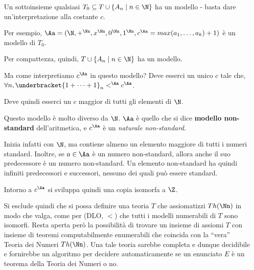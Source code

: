 \documentclass[a4paper,11pt]{report}
\begin{document}
Un sottoinsieme qualsiasi \( T_0 \subseteq T \cup \{A_n \mid n\in \N\} \) ha un modello - basta dare un'interpretazione alla costante \( c \).

Per esempio, \( \Aa = (\N, +^\Nn, x^\Nn, 0^\Nn, 1^\Nn, c^\Aa = max(a_1, \dots, a_k)+1)\) è un modello di \( T_0 \).

Per compattezza, quindi, \(T\cup \{A_n \mid n \in \N\}  \) ha un modello.

Ma come interpretiamo \( c^\Aa \) in questo modello? Deve esserci un unico \( c \) tale che, \( \forall n, \underbracket{1 + \dots + 1}_{n} <^\Aa c^\Aa  \).

Deve quindi esserci un \( c \) maggior di tutti gli elementi di \( \N \). 

Questo modello è molto diverso da \( \N \). \( \Aa \) è quello che si dice \textbf{modello non-standard} dell'aritmetica, e \( c^\Aa \) è un \textit{naturale non-standard}.

Inizia infatti con \( \N \), ma contiene almeno un elemento maggiore di tutti i numeri standard. Inoltre, se \( a\in \Aa \)  è un numero non-standard, allora anche il suo predecessore è un numero non-standard. Un elemento non-standard ha quindi infiniti predecessori e successori, nessuno dei quali può essere standard. 

Intorno a \( c^\Aa \) si sviluppa quindi una copia isomorfa a \( \Z \).

Si esclude quindi che si possa definire una teoria \( T \) che assiomatizzi \( Th(\Nn) \) in modo che valga, come per (DLO, \( < \)) che tutti i modelli numerabili di \( T \) sono isomorfi. Resta aperta però la possibilità di trovare un insieme di assiomi \( T \) con insieme di teoremi computabilmente enumerabili che coincida con la ``vera'' Teoria dei Numeri \( Th(\Nn) \). Una tale teoria sarebbe completa e dunque decidibile e fornirebbe un algoritmo per decidere automaticamente se un enunciato \( E \) è un teorema della Teoria dei Numeri o no.
\end{document}
